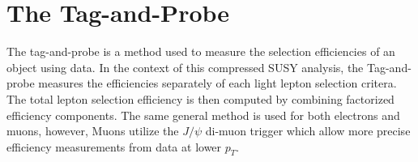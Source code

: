 \newcommand{\ID}{\text{ID}}
\newcommand{\Prompt}{\text{Prompt}}
\newcommand{\Isolated}{\text{Isolated}}
\newcommand{\Gold}{\text{Gold}}
\newcommand{\Silver}{\text{Silver}}
\newcommand{\Bronze}{\text{Bronze}}



\newcommand\FigureFour[6]{%
\begin{figure}[!htbp]%
\centering
\texttt{[image: fig/Lep\_Obj\_plots/\#1]}\hfill
\texttt{[image: fig/Lep\_Obj\_plots/\#2]}\hfill
\texttt{[image: fig/Lep\_Obj\_plots/\#3]}\hfill
\texttt{[image: fig/Lep\_Obj\_plots/\#4]}\hfill
\caption{#6}
\label{#5}
\end{figure}}

\newcommand\FigureThree[5]{%
\begin{figure}[!htbp]%
\centering
\texttt{[image: fig/Lep\_Obj\_plots/\#1]}
\texttt{[image: fig/Lep\_Obj\_plots/\#2]}\hfill
\texttt{[image: fig/Lep\_Obj\_plots/\#3]}\hfill
\caption{#4}
\label{#5}
\end{figure}}

\newcommand\FigureTwo[4]{%
\begin{figure}[!htbp]%
\centering
\texttt{[image: fig/Lep\_Obj\_plots/\#1]}\hfill
\texttt{[image: fig/Lep\_Obj\_plots/\#2]}\hfill
\caption{#4}
\label{#3}
\end{figure}}

\setcounter{secnumdepth}{3}
\setcounter{tocdepth}{3}
\setlength{\parskip}{\smallskipamount}
\setlength{\parindent}{0pt}


\makeatletter


\providecommand{\tabularnewline}{\\}


\makeatother

%

\chapter{The Tag-and-Probe}

\begin{chapterabstract}
The tag-and-probe is a method used to measure the selection efficiencies of an object using data. In the context of this compressed SUSY analysis, the Tag-and-probe measures the efficiencies separately of each light lepton selection critera. The total lepton selection efficiency is then computed by combining factorized efficiency components. The same general method is used for both electrons and muons, however, Muons utilize  the $J/\psi$ di-muon trigger which allow more precise efficiency measurements from data at lower $p_T$.
\end{chapterabstract}

